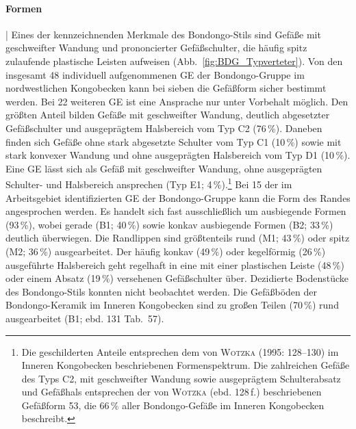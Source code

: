 \paragraph{Formen}\hspace{-.5em}|\hspace{.5em}%
Eines der kennzeichnenden Merkmale des Bondongo-Stils sind Gefäße mit geschweifter Wandung und prononcierter Gefäßschulter, die häufig spitz zulaufende plastische Leisten aufweisen (Abb.~\ref{fig:BDG_Typverteter}). Von den insgesamt 48 individuell aufgenommenen GE der Bondongo-Gruppe im nordwestlichen Kongobecken kann bei sieben die Gefäßform sicher bestimmt werden. Bei 22 weiteren GE ist eine Ansprache nur unter Vorbehalt möglich. Den größten Anteil bilden Gefäße mit geschweifter Wandung, deutlich abgesetzter Gefäßschulter und ausgeprägtem Halsbereich vom Typ C2 (76\,\%). Daneben finden sich Gefäße ohne stark abgesetzte Schulter vom Typ C1 (10\,\%) sowie mit stark konvexer Wandung und ohne ausgeprägten Halsbereich vom Typ D1 (10\,\%). Eine GE lässt sich als Gefäß mit geschweifter Wandung, ohne ausgeprägten Schulter- und Halsbereich ansprechen (Typ E1; 4\,\%).\footnote{Die geschilderten Anteile entsprechen dem von \textsc{Wotzka} (1995: 128--130) im Inneren Kongobecken beschriebenen Formenspektrum. Die zahlreichen Gefäße des Typs C2, mit geschweifter Wandung sowie ausgeprägtem Schulterabsatz und Gefäßhals entsprechen der von \textsc{Wotzka} (ebd. 128\,f.) beschriebenen Gefäßform 53, die 66\,\% aller Bondongo-Gefäße im Inneren Kongobecken beschreibt.} Bei 15 der im Arbeitsgebiet identifizierten GE der Bondongo-Gruppe kann die Form des Randes angesprochen werden. Es handelt sich fast ausschließlich um ausbiegende Formen (93\,\%), wobei gerade (B1; 40\,\%) sowie konkav ausbiegende Formen (B2; 33\,\%) deutlich überwiegen. Die Randlippen sind größtenteils rund (M1; 43\,\%) oder spitz (M2; 36\,\%) ausgearbeitet. Der häufig konkav (49\,\%) oder kegelförmig (26\,\%) ausgeführte Halsbereich geht regelhaft in eine mit einer plastischen Leiste (48\,\%) oder einem Absatz (19\,\%) versehenen Gefäßschulter über. Dezidierte Bodenstücke des Bondongo-Stils konnten nicht beobachtet werden. Die Gefäßböden der Bondongo-Keramik im Inneren Kongobecken sind zu großen Teilen (70\,\%) rund ausgearbeitet (B1; ebd. 131 Tab.~57).

